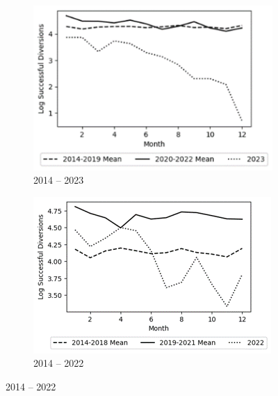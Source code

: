 \begin{figure}[htbp]
  \centering
  \caption{Monthly Log Total Of SFDA Successful Diversions}
  \begin{subfigure}[b]{0.48\textwidth}
    \includegraphics[width=\textwidth]{graphs/sfda_action_graphs/Monthly Log Total Of Successful Diversions A.png}
    \caption*{2014 – 2023}
    \label{subfig:left_sd}
  \end{subfigure}
  \hfill
  \begin{subfigure}[b]{0.48\textwidth}
    \includegraphics[width=\textwidth]{graphs/sfda_action_graphs/Monthly Log Total Of Successful Diversions B.png}
    \caption*{2014 – 2022}
    \label{subfig:right_sd}
  \end{subfigure}
  \label{fig:overall_sd}
\end{figure}